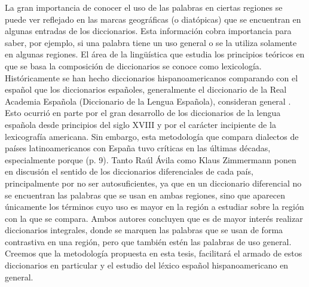 La gran importancia de conocer el uso de las palabras en ciertas regiones se puede ver reflejado en las marcas geográficas (o diatópicas) que se encuentran en algunas entradas de los diccionarios. Esta información cobra importancia para saber, por ejemplo, si una palabra tiene un uso general o se la utiliza solamente en algunas regiones. El área de la lingüística que estudia los principios teóricos en que se basa la composición de diccionarios se conoce como lexicología. Históricamente se han hecho diccionarios hispanoamericanos comparando con el español que los diccionarios españoles, generalmente el diccionario de la Real Academia Española (Diccionario de la Lengua Española), consideran general \cite {zimmermann2006fin}. Esto ocurrió en parte por el gran desarrollo de los diccionarios de la lengua española desde principios del siglo XVIII y por el carácter incipiente de la lexicografía americana. Sin embargo, esta metodología que compara dialectos de países latinoamericanos con España tuvo críticas en las últimas décadas, especialmente porque (p. 9). Tanto Raúl Ávila como Klaus Zimmermann ponen en discusión el sentido de los diccionarios diferenciales de cada país, principalmente por no ser autosuficientes, ya que en un diccionario diferencial no se encuentran las palabras que se usan en ambas regiones, sino que aparecen únicamente los términos cuyo uso es mayor en la región a estudiar sobre la región con la que se compara. Ambos autores concluyen que es de mayor interés realizar diccionarios integrales, donde se marquen las palabras que se usan de forma contrastiva en una región, pero que también estén las palabras de uso general. Creemos que la metodología propuesta en esta tesis, facilitará el armado de estos diccionarios en particular y el estudio del léxico español hispanoamericano en general.\\




